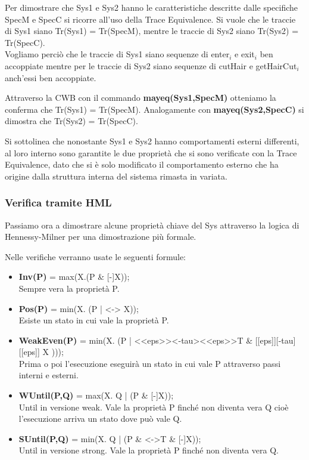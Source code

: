 Per dimostrare che \textsf{Sys1} e \textsf{Sys2} hanno le caratteristiche descritte dalle specifiche \textsf{SpecM} e \textsf{SpecC} si ricorre all'uso della Trace Equivalence. Si vuole che le traccie di \textsf{Sys1} siano\textsf{ Tr(Sys1) = Tr(SpecM)}, mentre le traccie di \textsf{Sys2} siano \textsf{Tr(Sys2) = Tr(SpecC)}. \\
Vogliamo perciò che le traccie di \textsf{Sys1} siano sequenze di \textsf{enter$_{i}$} e \textsf{exit$_{i}$} ben accoppiate mentre per le traccie di \textsf{Sys2} siano sequenze di \textsf{cutHair} e \textsf{getHairCut$_{i}$} anch'essi ben accoppiate.

Attraverso la CWB con il commando \textbf{mayeq(Sys1,SpecM)} otteniamo la conferma che \textsf{Tr(Sys1) = Tr(SpecM)}. Analogamente con \textbf{mayeq(Sys2,SpecC)} si dimostra che \textsf{Tr(Sys2) = Tr(SpecC)}.

Si sottolinea che nonostante \textsf{Sys1} e \textsf{Sys2} hanno comportamenti esterni differenti, al loro interno sono garantite le due proprietà che si sono verificate con la Trace Equivalence, dato che si è solo modificato il comportamento esterno che ha origine dalla struttura interna del sistema rimasta in variata.

\subsubsection{Verifica tramite HML}

Passiamo ora a dimostrare alcune proprietà chiave del \textsf{Sys} attraverso la logica di Hennessy-Milner per una dimostrazione più formale.

Nelle verifiche verranno usate le seguenti formule:
\begin{itemize}
	\item \textbf{Inv(P)} = \textsf{max(X.(P \& [-]X));}\\
	Sempre vera la proprietà P.
	\item \textbf{Pos(P)} = \textsf{min(X. (P | <-> X));}\\
	Esiste un stato in cui vale la proprietà P.
	\item \textbf{WeakEven(P)} = \textsf{min(X. (P | <<eps>><-tau><<eps>>T \& [[eps]][-tau][[eps]] X )));}\\
	Prima o poi l'esecuzione eseguirà un stato in cui vale P attraverso passi interni e esterni.
	\item \textbf{WUntil(P,Q)} = \textsf{max(X. Q | (P \& [-]X));}\\
	Until in versione weak. Vale la proprietà P finché non diventa vera Q cioè l'esecuzione arriva un stato dove può vale Q.
	\item \textbf{SUntil(P,Q)} = \textsf{min(X. Q | (P \& <->T \& [-]X));}\\
	Until in versione strong. Vale la proprietà P finché non diventa vera Q.
\end{itemize}

